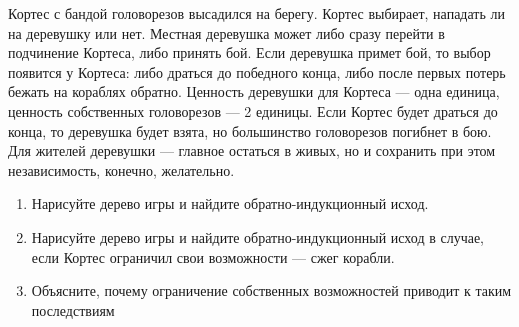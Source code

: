 \begin{problem}[Кортес {[О]}]\par
Кортес с бандой головорезов высадился на берегу. Кортес выбирает, нападать ли на деревушку или нет. Местная деревушка может либо сразу перейти в подчинение Кортеса, либо принять бой. Если деревушка примет бой, то выбор появится у Кортеса: либо драться до победного конца, либо после первых потерь бежать на кораблях обратно. Ценность деревушки для Кортеса — одна единица, ценность собственных головорезов — 2 единицы. Если Кортес будет драться до конца, то деревушка будет взята, но большинство головорезов погибнет в бою. Для жителей деревушки — главное остаться в живых, но и сохранить при этом независимость, конечно, желательно.\par
\begin{enumerate}
\item  Нарисуйте дерево игры и найдите обратно-индукционный исход.\par
\item Нарисуйте дерево игры и найдите обратно-индукционный исход в случае, если Кортес ограничил свои возможности — сжег корабли.\par
\item  Объясните, почему ограничение собственных возможностей приводит к таким последствиям \par
\end{enumerate}


\begin{sol}

\end{sol}
\end{problem}




